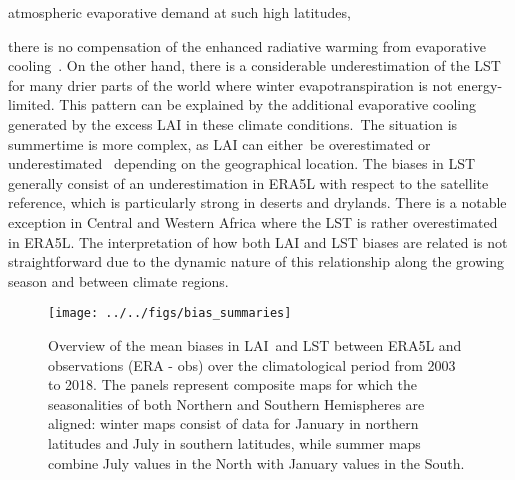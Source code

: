 \documentclass[gmd, manuscript]{copernicus}
\begin{document}
atmospheric evaporative demand at such high latitudes,~{there is no
compensation of the enhanced radiative warming from evaporative
cooling~\citep{bright2017local}. On the other hand, there is a considerable
underestimation of the LST for many drier parts of the world where
winter evapotranspiration is not energy-limited. This pattern can be
explained by the additional evaporative cooling generated by the excess
LAI in these climate conditions.~The situation is summertime is more
complex, as LAI can either~be overestimated or underestimated~ depending
on the geographical location. The biases in LST generally consist of an
underestimation in ERA5L with respect to the satellite reference, which
is particularly strong in deserts and drylands. There is a notable
exception in Central and Western Africa where the LST is rather
overestimated in ERA5L. The interpretation of how both LAI and LST
biases are related is not straightforward due to the dynamic nature of
this relationship along the growing season and between climate regions.~

\par\null{}
\begin{figure}[H]
\begin{center}
\texttt{[image: ../../figs/bias\_summaries]}
\caption{{{Overview of the mean biases} in LAI~and LST between ERA5L and
observations (ERA - obs) over the climatological period from 2003 to
2018. The panels represent composite maps for which the seasonalities of
both Northern and Southern Hemispheres are aligned: winter maps consist
of data for January in northern latitudes and July in southern
latitudes, while summer maps combine July values in the North with
January values in the South.
{\label{220254}}%
}}
\end{center}
\end{figure}

\par\null

}
\end{document}

